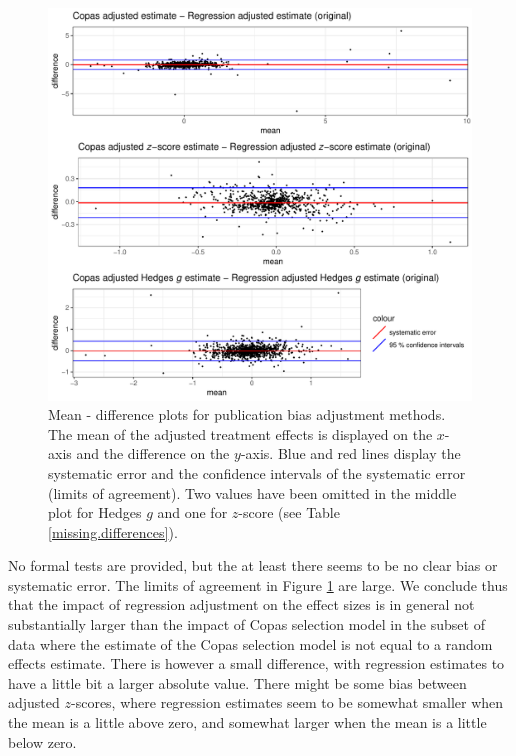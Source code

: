 \documentclass[11pt,a4paper,twoside]{book}\usepackage[]{graphicx}\usepackage[]{color}
\newenvironment{knitrout}{}{} %
\begin{document}
\begin{figure}
\begin{knitrout}
\color{fgcolor}

{\centering \includegraphics[width=\textwidth-3cm]{figure/ch03_figunnamed-chunk-23-1} 

}



\end{knitrout}
\caption{Mean - difference plots for publication bias adjustment methods. The mean of the adjusted treatment effects is displayed on the $x$-axis and the difference on the $y$-axis. Blue and red lines display the systematic error and the confidence intervals of the systematic error (limits of agreement). Two values have been omitted in the middle plot for Hedges $g$ and one for $z$-score (see Table \ref{missing.differences}).}
\label{fig:adjustment.mean.diff}
\end{figure}

No formal tests are provided, but the at least there seems to be no clear bias or systematic error. The limits of agreement in Figure \ref{fig:adjustment.mean.diff} are large. We conclude thus that the impact of regression adjustment on the effect sizes is in general not substantially larger than the impact of Copas selection model in the subset of data where the estimate of the Copas selection model is not equal to a random effects estimate. There is however a small difference, with regression estimates to have a little bit a larger absolute value. There might be some bias between adjusted $z$-scores, where regression estimates seem to be somewhat smaller when the mean is a little above zero, and somewhat larger when the mean is a little below zero. \\
\end{document}
